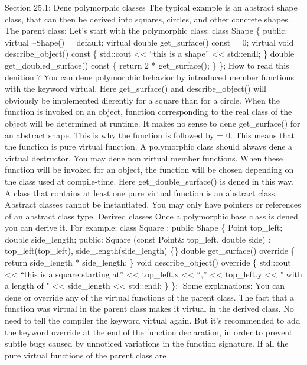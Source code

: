 Section 25.1: Dene polymorphic classes The typical example is an
abstract shape class, that can then be derived into squares, circles,
and other concrete shapes. The parent class: Let's start with the
polymorphic class: class Shape \{ public: virtual
\textasciitilde Shape() = default; virtual double get\_surface() const =
0; virtual void describe\_object() const \{ std::cout
\textless\textless{} ``this is a shape'' \textless\textless{} std::endl;
\} double get\_doubled\_surface() const \{ return 2 * get\_surface(); \}
\}; How to read this denition ? You can dene polymorphic behavior by
introduced member functions with the keyword virtual. Here
get\_surface() and describe\_object() will obviously be implemented
dierently for a square than for a circle. When the function is invoked
on an object, function corresponding to the real class of the object
will be determined at runtime. It makes no sense to dene get\_surface()
for an abstract shape. This is why the function is followed by = 0. This
means that the function is pure virtual function. A polymorphic class
should always dene a virtual destructor. You may dene non virtual member
functions. When these function will be invoked for an object, the
function will be chosen depending on the class used at compile-time.
Here get\_double\_surface() is dened in this way. A class that contains
at least one pure virtual function is an abstract class. Abstract
classes cannot be instantiated. You may only have pointers or references
of an abstract class type. Derived classes Once a polymorphic base class
is dened you can derive it. For example: class Square : public Shape \{
Point top\_left; double side\_length; public: Square (const Point\&
top\_left, double side) : top\_left(top\_left),
side\_length(side\_length) \{\} double get\_surface() override \{ return
side\_length * side\_length; \} void describe\_object() override \{
std::cout \textless\textless{} ``this is a square starting at''
\textless\textless{} top\_left.x \textless\textless{} ``,''
\textless\textless{} top\_left.y \textless\textless{} " with a length of
" \textless\textless{} side\_length \textless\textless{} std::endl; \}
\}; Some explanations: You can dene or override any of the virtual
functions of the parent class. The fact that a function was virtual in
the parent class makes it virtual in the derived class. No need to tell
the compiler the keyword virtual again. But it's recommended to add the
keyword override at the end of the function declaration, in order to
prevent subtle bugs caused by unnoticed variations in the function
signature. If all the pure virtual functions of the parent class are
